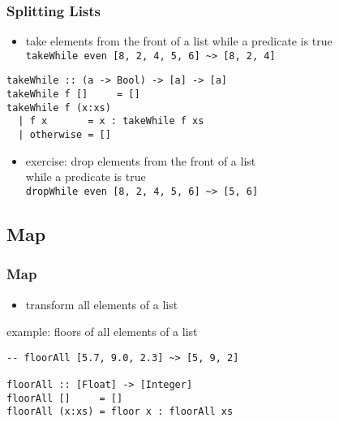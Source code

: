 \documentclass[dvipsnames]{beamer}
\theoremstyle{plain}
\begin{document}
\begin{frame}[fragile]
  \frametitle{Splitting Lists}

  \begin{itemize}
    \item take elements from the front of a list while a predicate is true\\
      \lstinline|takeWhile even [8, 2, 4, 5, 6] ~> [8, 2, 4]|
  \end{itemize}

  \begin{exampleblock}{}
    \begin{lstlisting}[deletekeywords={takeWhile}]
takeWhile :: (a -> Bool) -> [a] -> [a]
takeWhile f []     = []
takeWhile f (x:xs)
  | f x       = x : takeWhile f xs
  | otherwise = []
    \end{lstlisting}
  \end{exampleblock}

  \pause
  \begin{itemize}
    \item exercise: drop elements from the front of a list\\
      while a predicate is true\\
      \lstinline|dropWhile even [8, 2, 4, 5, 6] ~> [5, 6]|
  \end{itemize}
\end{frame}

\subsection{Map}

\begin{frame}[fragile]
  \frametitle{Map}

  \begin{itemize}
    \item transform all elements of a list
  \end{itemize}

  \begin{exampleblock}{example: floors of all elements of a list}
    \begin{lstlisting}
-- floorAll [5.7, 9.0, 2.3] ~> [5, 9, 2]

floorAll :: [Float] -> [Integer]
floorAll []     = []
floorAll (x:xs) = floor x : floorAll xs
    \end{lstlisting}
  \end{exampleblock}
\end{frame}
\end{document}

